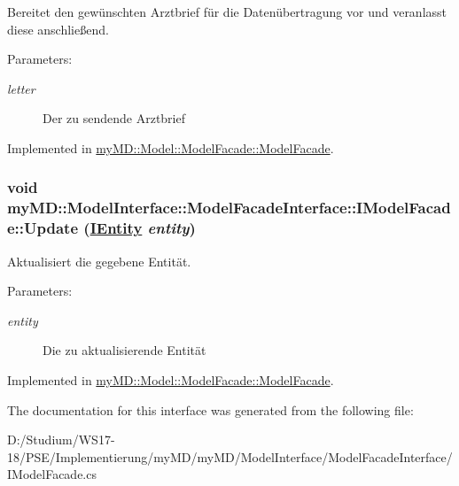 Bereitet den gew\"{u}nschten Arztbrief f\"{u}r die Daten\"{u}bertragung vor und veranlasst diese anschlie\ss{}end. 

\begin{Desc}
\item[Parameters:]
\begin{description}
\item[{\em letter}]Der zu sendende Arztbrief\end{description}
\end{Desc}


Implemented in \hyperlink{classmy_m_d_1_1_model_1_1_model_facade_1_1_model_facade_dbd560ba513112ff2c7fcf625fdf6597}{my\-MD::Model::Model\-Facade::Model\-Facade}.\hypertarget{interfacemy_m_d_1_1_model_interface_1_1_model_facade_interface_1_1_i_model_facade_bf510dc6cf79d153f564eca0f10971d2}{
\subsubsection[Update]{\setlength{\rightskip}{0pt plus 5cm}void my\-MD::Model\-Interface::Model\-Facade\-Interface::IModel\-Facade::Update (\hyperlink{interfacemy_m_d_1_1_model_interface_1_1_data_model_interface_1_1_i_entity}{IEntity} {\em entity})}}
\label{de/d3e/interfacemy_m_d_1_1_model_interface_1_1_model_facade_interface_1_1_i_model_facade_bf510dc6cf79d153f564eca0f10971d2}


Aktualisiert die gegebene Entit\"{a}t. 

\begin{Desc}
\item[Parameters:]
\begin{description}
\item[{\em entity}]Die zu aktualisierende Entit\"{a}t\end{description}
\end{Desc}


Implemented in \hyperlink{classmy_m_d_1_1_model_1_1_model_facade_1_1_model_facade_bf510dc6cf79d153f564eca0f10971d2}{my\-MD::Model::Model\-Facade::Model\-Facade}.

The documentation for this interface was generated from the following file:\begin{CompactItemize}
\item 
D:/Studium/WS17-18/PSE/Implementierung/my\-MD/my\-MD/Model\-Interface/Model\-Facade\-Interface/IModel\-Facade.cs\end{CompactItemize}
